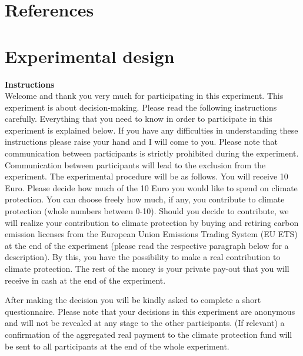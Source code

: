 \documentclass[review, authoryear,12pt]{elsarticle}
\begin{document}
\section*{References}





\clearpage

\appendix

\section{Experimental design}
\label{appa}
\textbf{Instructions} \\
Welcome and thank you very much for participating in this experiment.
This experiment is about decision-making. Please read the following instructions carefully. Everything that you need to know in order to participate in this experiment is explained below. If you have any difficulties in understanding these instructions please raise your hand and I will come to you.
Please note that communication between participants is strictly prohibited during the experiment. Communication between participants will lead to the exclusion from the experiment.
The experimental procedure will be as follows.
You will receive 10 Euro. Please decide how much of the 10 Euro you would like to spend on climate protection. You can choose freely how much, if any, you contribute to climate protection (whole numbers between 0-10).
Should you decide to contribute, we will realize your contribution to climate protection by buying and retiring carbon emission licenses from the European Union Emissions Trading System (EU ETS) at the end of the experiment (please read the respective paragraph below for a description). By this, you have the possibility to make a real contribution to climate protection. The rest of the money is your private pay-out that you will receive in cash at the end of the experiment.

After making the decision you will be kindly asked to complete a short questionnaire.
Please note that your decisions in this experiment are anonymous and will not be revealed at any stage to the other participants. (If relevant) a confirmation of the aggregated real payment to the climate protection fund will be sent to all participants at the end of the whole experiment. \\
\end{document}
